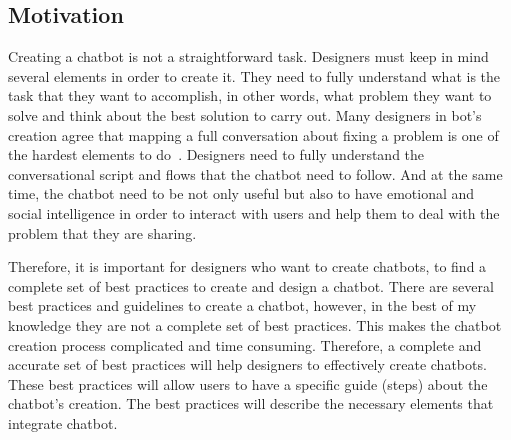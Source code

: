 \documentclass[a4paper,10pt]{article}
\begin{document}

\subsection*{Motivation}




Creating a chatbot is not a straightforward task. Designers must keep in mind several elements in order to create it. They need to fully understand what is the task that they want to accomplish, in other words, what problem they want to solve and think about the best solution to carry out. Many designers in bot's creation agree that mapping a full conversation about fixing a problem is one of the hardest elements to do~\cite{OreillyBots}. Designers need to fully understand the conversational script and flows that the chatbot need to follow. And at the same time, the chatbot need to be not only useful but also to have emotional and social intelligence in order to interact with users and help them to deal with the problem that they are sharing. 

Therefore, it is important for designers who want to create chatbots, to find a complete set of best practices to create and design a chatbot. There are several best practices and guidelines to create a chatbot, however, in the best of my knowledge they are not a complete set of best practices. This makes the chatbot creation process complicated and time consuming. Therefore, a complete and accurate set of best practices will help designers to effectively create chatbots. These best practices will allow users to have a specific guide (steps) about the chatbot's creation. The best practices will describe the necessary elements that integrate chatbot.     
\end{document}
